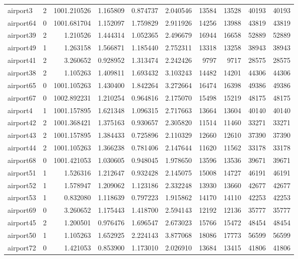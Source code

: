 \begin{longtable}{|l|r|r|r|r|r|r|r|r|r|}
airport3 & 2 & 1001.210526 & 1.165809 & 0.874737 & 2.040546 & 13584 & 13528 & 40193 & 40193 \\
airport64 & 0 & 1001.681704 & 1.152097 & 1.759829 & 2.911926 & 14256 & 13988 & 43819 & 43819 \\
airport39 & 2 & 1.210526 & 1.444314 & 1.052365 & 2.496679 & 16944 & 16658 & 52889 & 52889 \\
airport49 & 1 & 1.263158 & 1.566871 & 1.185440 & 2.752311 & 13318 & 13258 & 38943 & 38943 \\
airport41 & 2 & 3.260652 & 0.928952 & 1.313474 & 2.242426 & 9797 & 9717 & 28575 & 28575 \\
airport38 & 2 & 1.105263 & 1.409811 & 1.693432 & 3.103243 & 14482 & 14201 & 44306 & 44306 \\
airport65 & 0 & 1001.105263 & 1.430400 & 1.842264 & 3.272664 & 16474 & 16398 & 49386 & 49386 \\
airport67 & 0 & 1002.892231 & 1.210254 & 0.964816 & 2.175070 & 15498 & 15219 & 48175 & 48175 \\
airport4 & 1 & 1001.157895 & 1.621348 & 1.096315 & 2.717663 & 13664 & 13604 & 40140 & 40140 \\
airport42 & 2 & 1001.368421 & 1.375163 & 0.930657 & 2.305820 & 11514 & 11460 & 33271 & 33271 \\
airport43 & 2 & 1001.157895 & 1.384433 & 0.725896 & 2.110329 & 12660 & 12610 & 37390 & 37390 \\
airport44 & 2 & 1001.105263 & 1.366238 & 0.781406 & 2.147644 & 11620 & 11562 & 33178 & 33178 \\
airport68 & 0 & 1001.421053 & 1.030605 & 0.948045 & 1.978650 & 13596 & 13536 & 39671 & 39671 \\
airport51 & 1 & 1.526316 & 1.212647 & 0.932428 & 2.145075 & 15008 & 14727 & 46191 & 46191 \\
airport52 & 1 & 1.578947 & 1.209062 & 1.123186 & 2.332248 & 13930 & 13660 & 42677 & 42677 \\
airport53 & 1 & 0.832080 & 1.118639 & 0.797223 & 1.915862 & 14170 & 14110 & 42253 & 42253 \\
airport69 & 0 & 3.260652 & 1.175443 & 1.418700 & 2.594143 & 12192 & 12136 & 35777 & 35777 \\
airport45 & 2 & 1.200501 & 0.976476 & 1.696547 & 2.673023 & 15766 & 15472 & 48454 & 48454 \\
airport50 & 1 & 1.105263 & 1.652925 & 2.224143 & 3.877068 & 18086 & 17773 & 56599 & 56599 \\
airport72 & 0 & 1.421053 & 0.853900 & 1.173010 & 2.026910 & 13684 & 13415 & 41806 & 41806 \\

\end{longtable}
